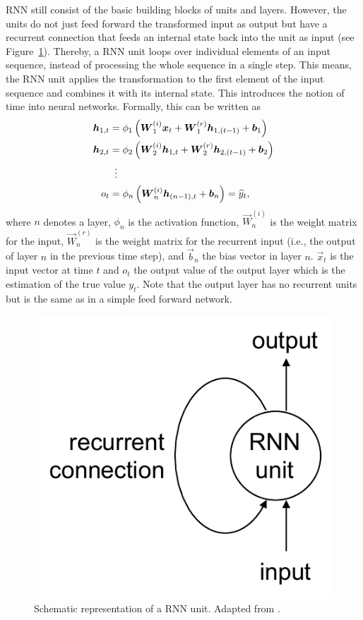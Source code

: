 RNN still consist of the basic building blocks of units and layers. However, the units do not just feed forward the transformed input as output but have a recurrent connection that feeds an internal state back into the unit as input (see Figure~\ref{Fig:RNNunit}). Thereby, a RNN unit loops over individual elements of an input sequence, instead of processing the whole sequence in a single step. This means, the RNN unit applies the transformation to the first element of the input sequence and combines it with its internal state. This introduces the notion of time into neural networks. Formally, this can be written as
%
\begin{equation} \label{Eq:RNN}
\begin{split}
    \vec{h}_{1,t}&=\phi_1\left(\vec{W}_1^{(i)}\vec{x}_t+\vec{W}^{(r)}_1\vec{h}_{1,(t-1)}+\vec{b}_1\right)\\
    \vec{h}_{2,t}&=\phi_2\left(\vec{W}_2^{(i)}\vec{h}_{1,t}+\vec{W}^{(r)}_2\vec{h}_{2,(t-1)}+\vec{b}_2\right)\\
    &\setbox0\hbox{=}\mathrel{\makebox[\wd0]{\hfil\vdots\hfil}}\\
    o_t&=\phi_n\left(\vec{W}_n^{(i)}\vec{h}_{(n-1),t}+\vec{b}_n\right)=\widehat{y}_t,
\end{split}
\end{equation}
%
where $n$ denotes a layer, $\phi_n$ is the activation function, $\vec{W}_n^{(i)}$ is the weight matrix for the input, $\vec{W}_n^{(r)}$ is the weight matrix for the recurrent input (i.e., the output of layer $n$ in the previous time step), and $\vec{b}_n$ the bias vector in layer $n$. $\vec{x}_t$ is the input vector at time $t$ and $o_t$ the output value of the output layer which is the estimation of the true value $y_t$. Note that the output layer has no recurrent units but is the same as in a simple feed forward network.
%
\begin{figure}[htbp]
    \centering
    \includegraphics[scale=0.5]{thesis/figures/RNNunit.pdf}
    \caption[Schematic representation of a RNN unit]{Schematic representation of a RNN unit. Adapted from \citet{Chollet:2018}.}
    \label{Fig:RNNunit}
\end{figure}

